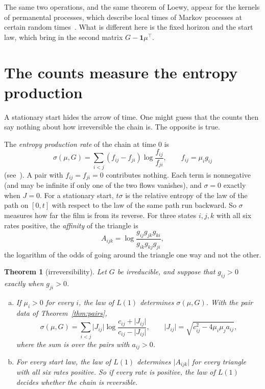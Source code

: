 \documentclass[11pt]{article}
\newtheorem{theorem}{Theorem}[section]
\theoremstyle{definition}
\theoremstyle{remark}
\newcommand{\one}{\mathbf 1}
\begin{document}
The same two operations, and the same theorem of Loewy, appear for the kernels
of permanental processes, which describe local times of Markov processes at
certain random times~\cite{mr2013}. What is different here is the fixed
horizon and the start law, which bring in the second matrix $G-\one\mu^{\top}$.

\section{The counts measure the entropy production}\label{sec:entropy}

A stationary start hides the arrow of time. One might guess that the counts
then say nothing about how irreversible the chain is. The opposite is true.

The \emph{entropy production rate} of the chain at time $0$ is
\[
 \sigma(\mu,G)=\sum_{i<j}(f_{ij}-f_{ji})\log\frac{f_{ij}}{f_{ji}},
 \qquad f_{ij}=\mu_ig_{ij}
\]
(see~\cite{schnakenberg1976}). A pair with $f_{ij}=f_{ji}=0$ contributes
nothing. Each term is nonnegative (and may be infinite if only one of the two flows
vanishes), and $\sigma=0$ exactly when $J=0$. For a stationary start, $t\sigma$ is the relative entropy of the
law of the path on $[0,t]$ with respect to the law of the same path run
backward. So $\sigma$ measures how far the film is from its reverse. For three
states $i,j,k$ with all six rates positive, the \emph{affinity} of the
triangle is
\[
 A_{ijk}=\log\frac{g_{ij}g_{jk}g_{ki}}{g_{ik}g_{kj}g_{ji}} ,
\]
the logarithm of the odds of going around the triangle one way and not the
other.

\begin{theorem}[irreversibility]\label{thm:entropy}
Let $G$ be irreducible, and suppose that $g_{ij}>0$ exactly when $g_{ji}>0$.
\begin{enumerate}[(a),itemsep=1pt]
\item If $\mu_i>0$ for every $i$, the law of $L(1)$ determines
 $\sigma(\mu,G)$. With the pair data of Theorem~\ref{thm:pairs},
 \[
 \sigma(\mu,G)=\sum_{i<j}\lvert J_{ij}\rvert
 \log\frac{c_{ij}+\lvert J_{ij}\rvert}{c_{ij}-\lvert J_{ij}\rvert},
 \qquad\lvert J_{ij}\rvert=\sqrt{c_{ij}^2-4\mu_i\mu_ja_{ij}} ,
 \]
 where the sum is over the pairs with $a_{ij}>0$.
\item For every start law, the law of $L(1)$ determines
 $\lvert A_{ijk}\rvert$ for every triangle with all six rates positive. So if
 every rate is positive, the law of $L(1)$ decides whether the chain is
 reversible.
\end{enumerate}
\end{theorem}
\end{document}
